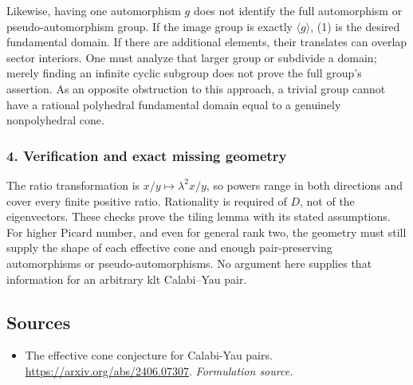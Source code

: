 \documentclass[11pt]{article}
\begin{document}
Likewise, having one automorphism $g$ does not identify the full automorphism or pseudo-automorphism group. If the image group is exactly $\langle g\rangle$, (1) is the desired fundamental domain. If there are additional elements, their translates can overlap sector interiors. One must analyze that larger group or subdivide a domain; merely finding an infinite cyclic subgroup does not prove the full group's assertion. As an opposite obstruction to this approach, a trivial group cannot have a rational polyhedral fundamental domain equal to a genuinely nonpolyhedral cone.

\subsubsection{4. Verification and exact missing geometry}
The ratio transformation is $x/y\mapsto\lambda^2x/y$, so powers range in both directions and cover every finite positive ratio. Rationality is required of $D$, not of the eigenvectors. These checks prove the tiling lemma with its stated assumptions. For higher Picard number, and even for general rank two, the geometry must still supply the shape of each effective cone and enough pair-preserving automorphisms or pseudo-automorphisms. No argument here supplies that information for an arbitrary klt Calabi--Yau pair.

\subsection{Sources}
\begin{itemize}
\item[S1]The effective cone conjecture for Calabi-Yau pairs.
\url{https://arxiv.org/abs/2406.07307}.
\textit{Formulation source.}
\end{itemize}
\end{document}
